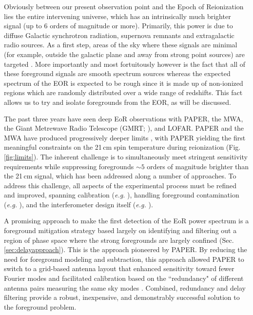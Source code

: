 \documentclass[preprint,11pt]{aastex}
\begin{document}
Obviously between our present observation point and the Epoch of Reionization lies the entire intervening universe, which has an intrinsically much brighter signal (up to 6 orders of magnitude or more).  Primarily, this power is due to diffuse Galactic synchrotron radiation, supernova remnants and extragalactic radio sources.  As a first step, areas of the sky where these signals are minimal (for example, outside the galactic plane and away from strong point sources) are targeted \citep{bernardi_2013}.  More importantly and most fortuitously however is the fact that all of these foreground signals are smooth spectrum sources whereas the expected spectrum of the EOR is expected to be rough since it is made up of non-ionized regions which are randomly distributed over a wide range of redshifts.  This fact allows us to try and isolate foregrounds from the EOR, as will be discussed.

The past three years have seen deep EoR observations with PAPER, the MWA, 
the Giant Metrewave Radio Telescope (GMRT; \citealt{paciga_et_al2013}), and LOFAR.
PAPER and the MWA have produced progressively deeper limits
\citep{dillon_et_al2015,parsons_etal2014,ali_et_al2015}, with PAPER
yielding the first meaningful constraints on the 21\,cm spin temperature during reionization
(Fig. \ref{fig:limits}).
The inherent challenge is to simultaneously meet stringent sensitivity requirements 
while suppressing foregrounds $\sim5$ orders of magnitude
brighter than the 21\,cm signal, which has been addressed along a number of approaches.  
To address this challenge,  all aspects of the experimental process must be refined and improved, spanning 
calibration ({\em e.g.} \cite{zheng_et_al2014, jacobs_et_al2016, barry_et_al2016}), handling foreground contamination
({\em e.g.} \cite{moore_et_al2013,moore_et_al2016,thyagarajan_et_al2015a,pober_et_al2016}),
and the interferometer design itself ({\em e.g.} \cite{parsons_et_al2012a,dillon_parsons2016}).

A promising approach to make the first detection of the EoR power spectrum 
is a foreground mitigation strategy based largely
on identifying and filtering out a region of phase space where the strong foregrounds are largely confined (Sec. \ref{sec:delayapproach}).  This is the approach
pioneered by PAPER.
By reducing the need
for foreground modeling and subtraction, this approach allowed PAPER to switch to a grid-based antenna layout that
enhanced sensitivity toward fewer Fourier modes and facilitated calibration
based on the ``redundancy" of different antenna pairs measuring the same sky modes \citep{liu_et_al2010,zheng_et_al2014}.
Combined, redundancy and delay filtering provide a robust, inexpensive, and demonstrably successful solution 
to the foreground problem.
\end{document}
